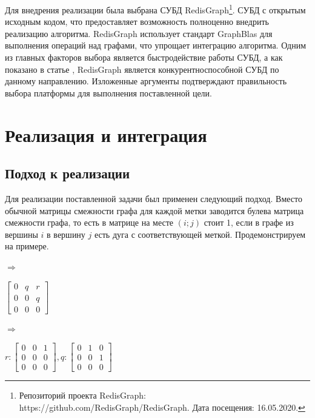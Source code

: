 \documentclass[14pt]{matmex-diploma}
\theoremstyle{definition}
\begin{document}
Для внедрения реализации была выбрана СУБД RedisGraph\footnote{Репозиторий проекта RedisGraph: https://github.com/RedisGraph/RedisGraph. Дата посещения: 16.05.2020.}. СУБД с открытым исходным кодом, что предоставляет возможность полноценно внедрить реализацию алгоритма. RedisGraph использует стандарт GraphBlas для выполнения операций над графами, что упрощает интеграцию алгоритма. Одним из главных факторов выбора является быстродействие работы СУБД, а как показано в статье \cite{DBLP}, RedisGraph является конкурентноспособной СУБД по данному направлению. Изложенные аргументы подтверждают правильность выбора платформы для выполнения поставленной цели.


\section{Реализация и интеграция}

\subsection{Подход к реализации}

Для реализации поставленной задачи был применен следующий подход. Вместо обычной матрицы смежности графа для каждой метки заводится булева матрица смежности графа, то есть в матрице на месте $(i;j)$ стоит 1, если в графе из вершины $i$ в вершину $j$ есть дуга с соответствующей меткой. Продемонстрируем на примере.

\bigskip

\begin{minipage}[m]{0.2\linewidth}


\end{minipage}
$\Rightarrow$\hfill
\begin{minipage}[m]{0.12\linewidth}
$\begin{bmatrix} 
0 & q & r \\
0 & 0 & q \\
0 & 0 & 0
\end{bmatrix}
$
\end{minipage}
$\Rightarrow$\hfill
\begin{minipage}[m]{0.5\linewidth}

$r: \begin{bmatrix} 0 & 0 & 1 \\ 0 & 0 & 0 \\ 0 & 0 & 0 \end{bmatrix}, q: \begin{bmatrix} 0 & 1 & 0 \\ 0 & 0 & 1 \\ 0 & 0 & 0 \end{bmatrix}$

\end{minipage}
\end{document}
